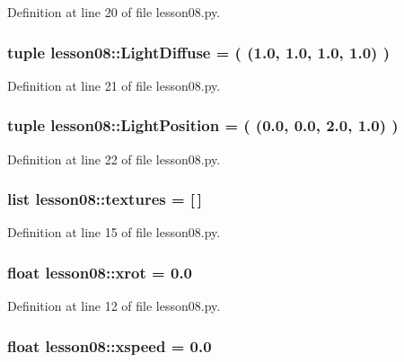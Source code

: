 Definition at line 20 of file lesson08.py.
\subsubsection{\setlength{\rightskip}{0pt plus 5cm}tuple {\bf lesson08::LightDiffuse} = ( (1.0, 1.0, 1.0, 1.0) )\hspace{0.3cm}{\tt  [static]}}\label{namespacelesson08_c0b08e554138c230a8a6682262cd8a8a}




Definition at line 21 of file lesson08.py.
\subsubsection{\setlength{\rightskip}{0pt plus 5cm}tuple {\bf lesson08::LightPosition} = ( (0.0, 0.0, 2.0, 1.0) )\hspace{0.3cm}{\tt  [static]}}\label{namespacelesson08_4a3cf07b07a0c99a1d75b25f29ca93bf}




Definition at line 22 of file lesson08.py.
\subsubsection{\setlength{\rightskip}{0pt plus 5cm}list {\bf lesson08::textures} = [$\,$]\hspace{0.3cm}{\tt  [static]}}\label{namespacelesson08_0755d32dbbf5c8f3c4c020f2f868f8b7}




Definition at line 15 of file lesson08.py.
\subsubsection{\setlength{\rightskip}{0pt plus 5cm}float {\bf lesson08::xrot} = 0.0\hspace{0.3cm}{\tt  [static]}}\label{namespacelesson08_f411f3978e78a072b2e6e28954a8a4b7}




Definition at line 12 of file lesson08.py.
\subsubsection{\setlength{\rightskip}{0pt plus 5cm}float {\bf lesson08::xspeed} = 0.0\hspace{0.3cm}{\tt  [static]}}\label{namespacelesson08_b29f81a27458f039d144a402d2d48066}




